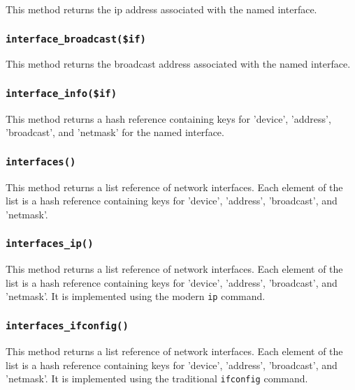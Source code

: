 This method returns the ip address associated with the named interface.

\subsubsection*{\texttt{interface\_broadcast(\$if)}\label{xPL::Base_interface_broadcast_if_}}


This method returns the broadcast address associated with the named
interface.

\subsubsection*{\texttt{interface\_info(\$if)}\label{xPL::Base_interface_info_if_}}


This method returns a hash reference containing keys for 'device',
'address', 'broadcast', and 'netmask' for the named interface.

\subsubsection*{\texttt{interfaces()}\label{xPL::Base_interfaces_}}


This method returns a list reference of network interfaces.  Each
element of the list is a hash reference containing keys for
'device', 'address', 'broadcast', and 'netmask'.

\subsubsection*{\texttt{interfaces\_ip()}\label{xPL::Base_interfaces_ip_}}


This method returns a list reference of network interfaces.  Each
element of the list is a hash reference containing keys for
'device', 'address', 'broadcast', and 'netmask'.  It is implemented
using the modern \texttt{ip} command.

\subsubsection*{\texttt{interfaces\_ifconfig()}\label{xPL::Base_interfaces_ifconfig_}}


This method returns a list reference of network interfaces.  Each
element of the list is a hash reference containing keys for
'device', 'address', 'broadcast', and 'netmask'.  It is implemented
using the traditional \texttt{ifconfig} command.


